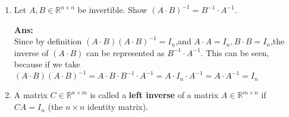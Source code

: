 \documentclass[12pt,a4paper]{amsart}
\newcommand{\R}{\mathbb{R}}
\newcommand\sol[1]{
\medskip
\begin{mdframed}
\textbf{Ans:\\} #1
\end{mdframed}
\medskip
}
\begin{document}
\begin{enumerate}
\sol{
  \begin{enumerate}
    \item
      Impossible, not a square matrix.
    \item
      Row reducing the matrix $$ \left[\begin{matrix} -3 & 2 & 4 & 1 & 0 & 0 \\ 0 & 1 & -2 & 0 & 1 & 0 \\ 1 & -3 & 4 & 0 & 0 & 1 \end{matrix}\right]$$
      we get the matrix $$\left[\begin{matrix} 1 & 0 & 0 & 1 & 10 & 4 \\ 0 & 1 & 0 & 1 & 8 & 3 \\ 0 & 0 & 1 & \frac{1}{2} & \frac{7}{2} & \frac{3}{2} \end{matrix}\right]$$
      and thus the inverse is $$\left[\begin{array}{rrr}
1 & 10 & 4 \\
1 & 8 & 3 \\
\frac{1}{2} & \frac{7}{2} & \frac{3}{2}
\end{array}\right]$$
    \item
      Row reducing the matrix $$ \left[\begin{array}{rrrrrr}
1 & 0 & 3 & 1 & 0 & 0 \\
0 & 1 & 1 & 0 & 1 & 0 \\
-1 & 2 & -1 & 0 & 0 & 1
\end{array}\right]$$
      we get the matrix $$ \left[\begin{array}{rrrrrr}
1 & 0 & 3 & 0 & 2 & -1 \\
0 & 1 & 1 & 0 & 1 & 0 \\
0 & 0 & 0 & 1 & -2 & 1
\end{array}\right]$$
      Since the left side does not form the identity matrix, there is no inverse.
  \end{enumerate}
}

\item    
 Let $A,B\in \R^{n\times n}$ be invertible. Show $(A\cdot B)^{-1} = B^{-1}\cdot A^{-1}$.

\sol{
Since by definition $(A\cdot B)(A\cdot B)^{-1} = I_n$,and $A\cdot A = I_n, B\cdot B = I_n$,the inverse of $(A\cdot B)$
can be represented as $B^{-1}\cdot A^{-1}$. This can be seen, because if we take $(A\cdot B)(A\cdot B)^{-1} = A\cdot B \cdot B^{-1} \cdot A^{-1} =  A\cdot I_n \cdot A^{-1} = A \cdot A^{-1} = I_n$
}

\item
 A matrix $C\in\R^{n\times m}$ is called a {\bf left inverse} of a matrix $A\in\R^{m\times n}$ if $CA=I_n$
 (the $n\times n$ identity matrix).


\end{enumerate}
\end{document}
